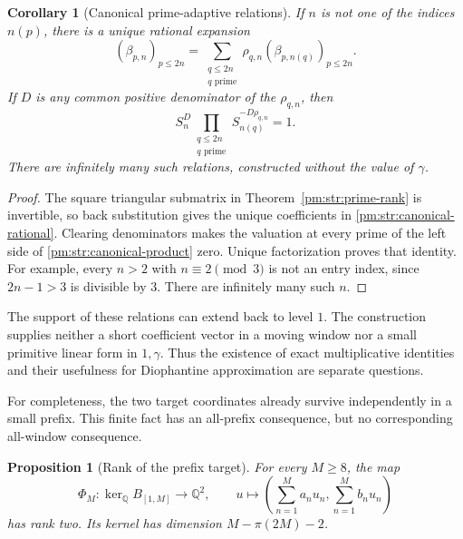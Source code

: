 \documentclass[11pt,a4paper]{article}
\newtheorem{proposition}[theorem]{Proposition}
\newtheorem{corollary}[theorem]{Corollary}
\theoremstyle{definition}
\theoremstyle{remark}
\numberwithin{equation}{section}
\begin{document}
\begin{corollary}[Canonical prime-adaptive relations]\label{pm:str:canonical}
If $n$ is not one of the indices $n(p)$, there is a unique rational
expansion
\begin{equation}\label{pm:str:canonical-rational}
 (\beta_{p,n})_{p\leq2n}
 =\sum_{\substack{q\leq2n\\q\text{ prime}}}\rho_{q,n}
       (\beta_{p,n(q)})_{p\leq2n}.
\end{equation}
If $D$ is any common positive denominator of the $\rho_{q,n}$, then
\begin{equation}\label{pm:str:canonical-product}
 S_n^D\prod_{\substack{q\leq2n\\q\text{ prime}}}
                  S_{n(q)}^{-D\rho_{q,n}}=1.
\end{equation}
There are infinitely many such relations, constructed without the value
of $\gamma$.
\end{corollary}

\begin{proof}
The square triangular submatrix in Theorem~\ref{pm:str:prime-rank} is
invertible, so back substitution gives the unique coefficients in
\eqref{pm:str:canonical-rational}.  Clearing denominators makes the
valuation at every prime of the left side of
\eqref{pm:str:canonical-product} zero.  Unique factorization proves that
identity.  For example, every $n>2$ with $n\equiv2\pmod3$ is not an
entry index, since $2n-1>3$ is divisible by $3$.  There are infinitely
many such $n$.
\end{proof}

The support of these relations can extend back to level $1$.
The construction supplies neither a short coefficient vector in a
moving window nor a small primitive linear form in $1,\gamma$.
Thus the existence of exact multiplicative identities and their
usefulness for Diophantine approximation are separate questions.

For completeness, the two target coordinates already survive
independently in a small prefix.  This finite fact has an all-prefix
consequence, but no corresponding all-window consequence.

\begin{proposition}[Rank of the prefix target]\label{pm:str:prefix-target}
For every $M\geq8$, the map
\[
 \Phi_M:\ker_{\mathbb Q}B_{[1,M]}\longrightarrow\mathbb Q^2,
 \qquad u\longmapsto\left(\sum_{n=1}^M a_nu_n,
                            \sum_{n=1}^M b_nu_n\right)
\]
has rank two.  Its kernel has dimension $M-\pi(2M)-2$.
\end{proposition}
\end{document}
